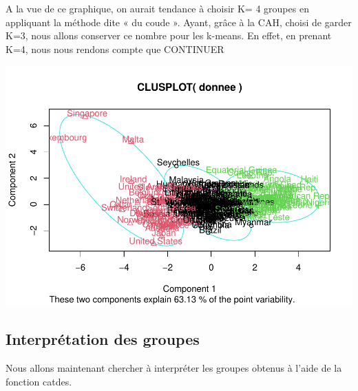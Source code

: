 \documentclass[
]{article}
\newenvironment{Shaded}{}{}
\newcommand{\AttributeTok}[1]{#1}
\newcommand{\DecValTok}[1]{#1}
\newcommand{\FunctionTok}[1]{#1}
\newcommand{\NormalTok}[1]{#1}
\newcommand{\OtherTok}[1]{\textcolor[rgb]{1.00,0.25,0.00}{#1}}
\newcommand{\SpecialCharTok}[1]{\textcolor[rgb]{0.00,0.50,0.50}{#1}}
\begin{document}
A la vue de ce graphique, on aurait tendance à choisir K= 4 groupes en
appliquant la méthode dite « du coude ». Ayant, grâce à la CAH, choisi
de garder K=3, nous allons conserver ce nombre pour les k-means. En
effet, en prenant K=4, nous nous rendons compte que CONTINUER

\begin{Shaded}
\end{Shaded}

\includegraphics{Projet_files/figure-latex/unnamed-chunk-21-1.pdf}

\hypertarget{interpruxe9tation-des-groupes}{%
\subsection{Interprétation des
groupes}\label{interpruxe9tation-des-groupes}}

Nous allons maintenant chercher à interpréter les groupes obtenus à
l'aide de la fonction catdes.

\begin{Shaded}
\end{Shaded}
\end{document}
